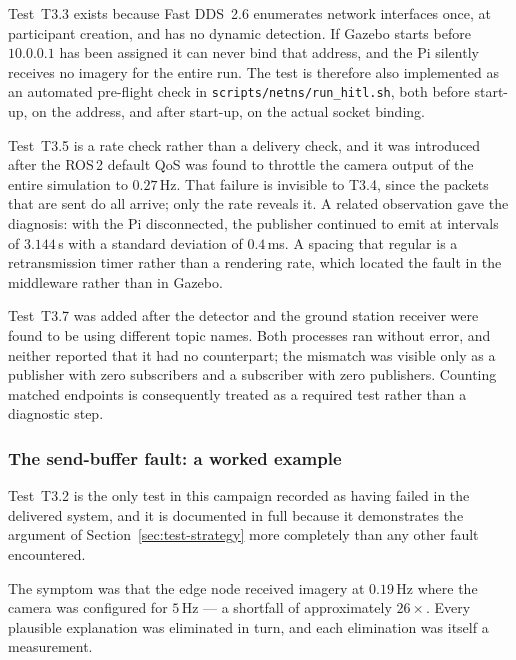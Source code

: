 Test~T3.3 exists because Fast DDS~2.6 enumerates network interfaces once,
at participant creation, and has no dynamic detection. If Gazebo starts
before $10.0.0.1$ has been assigned it can never bind that address, and the
Pi silently receives no imagery for the entire run. The test is therefore
also implemented as an automated pre-flight check in
\texttt{scripts/netns/run\_hitl.sh}, both before start-up, on the address,
and after start-up, on the actual socket binding.

Test~T3.5 is a rate check rather than a delivery check, and it was
introduced after the ROS\,2 default QoS was found to throttle the camera
output of the entire simulation to $0.27$\,Hz. That failure is invisible to
T3.4, since the packets that are sent do all arrive; only the rate reveals
it. A related observation gave the diagnosis: with the Pi disconnected, the
publisher continued to emit at intervals of $3.144$\,s with a standard
deviation of $0.4$\,ms. A spacing that regular is a retransmission timer
rather than a rendering rate, which located the fault in the middleware
rather than in Gazebo.

Test~T3.7 was added after the detector and the ground station receiver were
found to be using different topic names. Both processes ran without error,
and neither reported that it had no counterpart; the mismatch was visible
only as a publisher with zero subscribers and a subscriber with zero
publishers. Counting matched endpoints is consequently treated as a required
test rather than a diagnostic step.

\subsubsection{The send-buffer fault: a worked example}
\label{sec:test-wmem}

Test~T3.2 is the only test in this campaign recorded as having failed in the
delivered system, and it is documented in full because it demonstrates the
argument of Section~\ref{sec:test-strategy} more completely than any other
fault encountered.

The symptom was that the edge node received imagery at \(0.19\)\,Hz where the
camera was configured for \(5\)\,Hz --- a shortfall of approximately
\(26\times\). Every plausible explanation was eliminated in turn, and each
elimination was itself a measurement.


